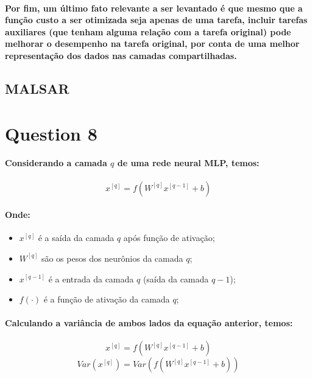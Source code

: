\documentclass[a4paper]{article}    %
\begin{document}
\paragraph{Por fim, um último fato relevante a ser levantado é que mesmo que a função custo a ser otimizada seja apenas de uma tarefa, incluir tarefas auxiliares (que tenham alguma relação com a tarefa original) pode melhorar o desempenho na tarefa original, por conta de uma melhor representação dos dados nas camadas compartilhadas.}

\subsection{MALSAR}


\newpage
\section*{Question 8}

\paragraph{Considerando a camada $q$ de uma rede neural MLP, temos:}
\[x^{[q]} = f(W^{[q]} x^{[q-1]} + b)\]

\paragraph{Onde:}
\begin{itemize}
    \item $x^{[q]}$ é a saída da camada $q$ após função de ativação;
    \item $W^{[q]}$ são os pesos dos neurônios da camada $q$;
    \item $x^{[q-1]}$ é a entrada da camada $q$ (saída da camada $q-1$);
    \item $f(\cdot)$ é a função de ativação da camada $q$;
\end{itemize}

\paragraph{Calculando a variância de ambos lados da equação anterior, temos:}

\[x^{[q]} = f(W^{[q]} x^{[q-1]} + b)\]
\[Var(x^{[q]}) = Var(f(W^{[q]} x^{[q-1]} + b))\]
\end{document}
